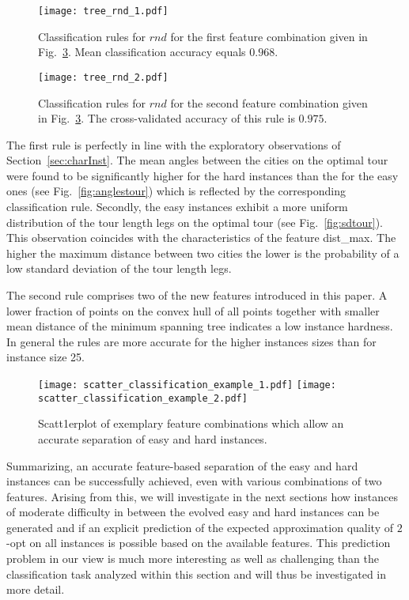 \documentclass{article}
\begin{document}
\begin{figure}
  \centering
  \texttt{[image: tree\_rnd\_1.pdf]}
  \caption{Classification rules for $rnd$ for the first feature
    combination given in Fig.~\ref{fig:class2d}. Mean classification
    accuracy equals $0.968$.}
  \label{fig:classrules1}
\end{figure}

\begin{figure}
  \centering
  \texttt{[image: tree\_rnd\_2.pdf]}
  \caption{Classification rules for $rnd$ for the second feature
    combination given in Fig.~\ref{fig:class2d}. The cross-validated
    accuracy of this rule is $0.975$.}
  \label{fig:classrules2}
\end{figure}

The first rule is perfectly in line with the exploratory observations
of Section~\ref{sec:charInst}. The mean angles between the cities on
the optimal tour were found to be significantly higher for the hard
instances than the for the easy ones (see Fig.~\ref{fig:anglestour})
which is reflected by the corresponding classification rule. Secondly, the
easy instances exhibit a more uniform distribution of the tour length
legs on the optimal tour (see Fig.~\ref{fig:sdtour}). This observation
coincides with the characteristics of the feature dist\_max. The
higher the maximum distance between two cities the lower is the
probability of a low standard deviation of the tour length legs.

The second rule comprises two of the new features introduced in this
paper. A lower fraction of points on the convex hull of all points
together with smaller mean distance of the minimum spanning tree
indicates a low instance hardness. In general the rules are more
accurate for the higher instances sizes than for instance size 25.

\begin{figure}[tb]
  \centering
  \texttt{[image: scatter\_classification\_example\_1.pdf]}
  \texttt{[image: scatter\_classification\_example\_2.pdf]}
  \caption{Scatt1erplot of exemplary feature combinations which allow
    an accurate separation of easy and hard instances. }
  \label{fig:class2d}
\end{figure}

Summarizing, an accurate feature-based separation of the easy and hard
instances can be successfully achieved, even with various combinations
of two features. Arising from this, we will investigate in the next
sections how instances of moderate difficulty in between the evolved
easy and hard instances can be generated and if an explicit prediction
of the expected approximation quality of $2$-opt on all instances is
possible based on the available features. This prediction problem in
our view is much more interesting as well as challenging than the
classification task analyzed within this section and will thus be
investigated in more detail.
\end{document}
